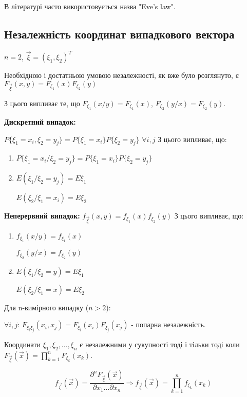 В літературі часто використовується назва "Eve's law".

\subsection{Незалежність координат випадкового вектора}

$n=2$, $\vec{\xi} = \left(\xi_1, \xi_2\right)^T$

Необхідною і достатньою умовою незалежності, як вже було розглянуто, є 
$F_{\vec{\xi}}(x, y) = F_{\xi_1}(x)F_{\xi_2}(y)$

З цього випливає те, що $F_{\xi_1}(x/y) = F_{\xi_1}(x)$, 
$F_{\xi_2}(y/x) = F_{\xi_2}(y)$.

\noindent\textbf{Дискретний випадок: }

$P\{\xi_1 = x_i, \xi_2 = y_j\} = P\{\xi_1 = x_i\}P\{\xi_2 = y_j\}$ 
$\forall i,j$
З цього випливає, що:

\begin{enumerate}
    \item $P\{\xi_1 = x_i / \xi_2 = y_j\} = 
    P\{\xi_1 = x_i\}P\{\xi_2 = y_j\}$
    \item $E(\xi_1 / \xi_2 = y_j) = E\xi_1$
    
    $E(\xi_2 / \xi_1 = x_i) = E\xi_2$
\end{enumerate}

\noindent\textbf{Неперервний випадок: }
$f_{\vec{\xi}}(x, y) = f_{\xi_1}(x)f_{\xi_2}(y)$
З цього випливає, що:

\begin{enumerate}
    \item $f_{\xi_1}(x/y) = f_{\xi_1}(x)$
    
    $f_{\xi_2}(y/x) = f_{\xi_2}(y)$
    \item $E(\xi_1 / \xi_2 = y) = E\xi_1$
    
    $E(\xi_2 / \xi_1 = x) = E\xi_2$
\end{enumerate}

Для n-вимірного випадку ($n > 2$):

$\forall i,j$: $F_{\xi_i\xi_j}(x_i, x_j) = F_{\xi_i}(x_i)F_{\xi_j}(x_j)$ - 
попарна незалежність.

\begin{definition}
    Координати $\xi_1, \xi_2, ..., \xi_n$ є незалежними у сукупності 
    тоді і тільки тоді коли $F_{\vec{\xi}}(\vec{x}) = 
    \prod\limits_{k=1}^n F_{\xi_k}(x_k)$.
\end{definition}
\begin{equation*}
    f_{\vec{\xi}}(\vec{x}) = \frac{\partial^nF_{\vec{\xi}}(\vec{x})}
    {\partial x_1...\partial x_n} \Rightarrow 
    f_{\vec{\xi}}(\vec{x}) = \prod\limits_{k=1}^n f_{\xi_k}(x_k)
\end{equation*}

